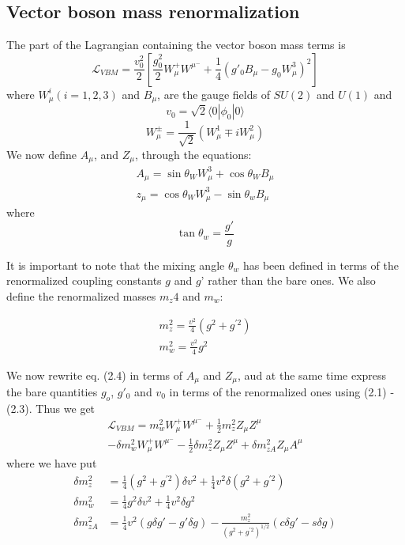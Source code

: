 \subsection{Vector boson mass renormalization}

The part of the Lagrangian containing the vector boson mass terms is 
\begin{equation}
\mathcal{L}_{V B M} = \frac{v_{0}^{2}}{2} \left[\frac{g_{0}^{2}}{2} W_{\mu}^{+} W^{\mu^{-}} + \frac{1}{4}(g'_{0} B_{\mu}-g_{0}W_{\mu}^{3})^{2}\right]\tag{2.4}
\end{equation}
where $W_{\mu}^{i} (i = 1,2,3)$ and $B_{\mu}$, are the gauge fields of $SU(2)$ and $U(1)$ and 
\begin{equation}
v_{0} = \sqrt{2}\langle 0|\phi_{0} |0\rangle \tag{2.5}
\end{equation}
\begin{equation}
W_{\mu}^{\pm} = \frac{1}{\sqrt{2}} (W_{\mu}^{1} \mp i W_{\mu}^{2})\tag{2.6}
\end{equation}
We now define $A_{\mu}$, and $Z_{\mu}$, through the equations: 
\begin{align*}
A_{\mu} = \sin \theta_{W} W^{3}_{\mu} + \cos \theta_{W} B_{\mu}\\
z_{\mu} = \cos\theta_{W} W^{3}_{\mu} - \sin\theta_{w} B_{\mu}\tag{2.7}
\end{align*}
where
\begin{equation}
\tan \theta_{w} = \frac{g'}{g}\tag{2.8}
\end{equation}

It is important to note that the mixing angle $\theta_{w}$ has been defined in terms of
the renormalized coupling constants $g$ and $g’$ rather than the bare ones. We also define the renormalized masses $m_{z}4$ and $m_{w}$: 

\begin{align*}
m^{2}_{z} = \frac{v^{2}}{4} (g^{2} + g^{'2})\tag{2.9}\\
m^{2}_{w} = \frac{v^{2}}{4}g^{2}\tag{2.10}
\end{align*}

We now rewrite eq. (2.4) in terms of $A_{\mu}$ and $Z_{\mu}$, aud at the same time express
the bare quantities $g_{o}$, $g'_{0}$ and $v_{0}$ in terms of the renormalized ones using (2.1)
- (2.3). Thus we get 
\begin{multline*}
\mathcal{L}_{VBM} = m^{2}_{w} W_{\mu}^{+}W^{\mu^{-}} + \frac{1}{2}m^{2}_{z}Z_{\mu} Z^{\mu}\\
-\delta m^{2}_{w}W_{\mu}^{+}W^{\mu^{-}} - \frac{1}{2}\delta m^{2}_{z}Z_{\mu}Z^{\mu} + \delta m^{2}_{z A} Z_{\mu} A^{\mu}\tag{2.11}
\end{multline*}
where we have put 
\begin{align}
\delta m^{2}_{z} &= \frac{1}{4}(g^{2} + g^{'2}) \delta v^{2} + \frac{1}{4} v^{2}\delta (g^{2} + g^{'2})\tag{2.12} \\
\delta m^{2}_{w} &= \frac{1}{4}g^{2}\delta v^{2} + \frac{1}{4} v^{2}\delta g^{2}\tag{2.13}\\
\delta m^{2}_{zA} &= \frac{1}{4} v^{2}(g \delta g'- g' \delta g) - \frac{m^{2}_{z}}{(g^{2} + g^{' 2})^{1/2}}(c\delta g' - s\delta g)\tag{2.14} 
\end{align}

